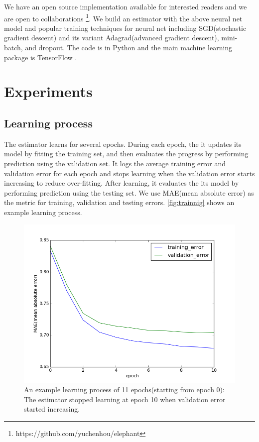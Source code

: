 \documentclass{article}
\begin{document}
We have an open source implementation available for interested readers and we 
are open to collaborations \footnote{https://github.com/yuchenhou/elephant}.
We build an estimator with the above neural net model and popular training 
techniques for neural net including SGD(stochastic gradient descent) and its 
variant Adagrad(advanced gradient descent), mini-batch, and dropout.
The code is in Python and the main machine learning package is TensorFlow 
\cite{tensorflow2015-whitepaper}.

\section{Experiments}

\subsection{Learning process}
The estimator learns for several epochs.
During each epoch, the it updates its model by fitting the training set, and 
then evaluates the progress by performing prediction using the validation set.
It logs the average training error and validation error for each epoch and 
stops learning when the validation error starts increasing to reduce 
over-fitting.
After learning, it evaluates the its model by performing prediction using the 
testing set.
We use MAE(mean absolute error) as the metric for training, validation and 
testing errors.
\autoref{fig:trainnig} shows an example learning process.
\begin{figure}[h]
	\centering
	\includegraphics[width=0.5\linewidth]{training}
	\caption{An example learning process of 11 epochs(starting from epoch 0): 
	The estimator stopped learning at epoch 10 when validation error started 
	increasing.}
	\label{fig:trainnig}
\end{figure}
\end{document}
